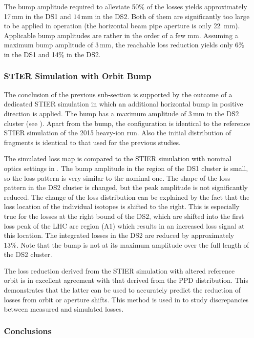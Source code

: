 The bump amplitude required to alleviate 50\% of the losses yields approximately 17$\,$mm in the DS1 and $14\,$mm in the DS2. Both of them are significantly too large to be applied in operation (the horizontal beam pipe aperture is only 22~mm). Applicable bump amplitudes are rather in the order of a few mm. Assuming a maximum bump amplitude of 3\,mm, the reachable loss reduction yields only 6\% in the DS1 and 14\% in the DS2. 

\subsubsection{STIER Simulation with Orbit Bump}

The conclusion of the previous sub-section is supported by the outcome of a dedicated STIER simulation in which an additional horizontal bump in positive direction is applied.  The bump has a maximum amplitude of \mbox{$3\,$mm} in the DS2 cluster (see ). Apart from the bump, the configuration is identical to the reference STIER simulation of the 2015 heavy-ion run. Also the initial distribution of fragments is identical to that used for the previous studies.

The simulated loss map is compared to the STIER simulation with nominal optics settings in .
The bump amplitude in the region of the DS1 cluster is small, so the loss pattern is very similar to the nominal one. The shape of the loss pattern in the DS2 cluster is changed, but the peak amplitude is not significantly reduced. The change of the loss distribution can be explained by the fact that the loss location of the individual isotopes is shifted to the right. This is especially true for the losses at the right bound of the DS2, which are shifted into the first loss peak of the LHC arc region (A1) which results in an increased loss signal at this location. The integrated losses in the DS2 are reduced by approximately 13\%. Note that the bump is not at its maximum amplitude over the full length of the DS2 cluster.


\newpage
The loss reduction derived from the STIER simulation with altered reference orbit is in excellent agreement with that derived from the PPD distribution. This demonstrates that the latter can be used to accurately predict the reduction of losses from orbit or aperture shifts. This method is used in  to study discrepancies between measured and simulated losses.

\subsubsection{Conclusions}

